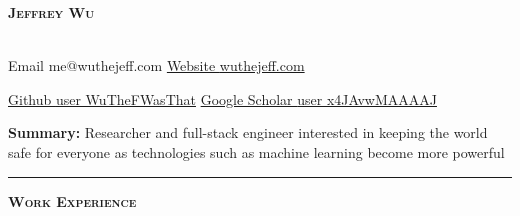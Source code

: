 \documentclass[11 pt]{article}
\begin{document}
\begin{center}
\begin{LARGE}\textsc{\textbf{Jeffrey Wu}}\end{LARGE} \\
Email {\tiny me@wuthejeff.com} \hfill
\href{http://wuthejeff.com}{Website {\tiny wuthejeff.com}}


\href{https://github.com/WuTheFWasThat}{Github {\tiny user WuTheFWasThat}}  \hfill \href{https://scholar.google.com/citations?user=x4JAvwMAAAAJ}{Google Scholar {\tiny user x4JAvwMAAAAJ}}\\
\end{center}

\noindent \textbf{Summary:}
Researcher and full-stack engineer
interested in keeping the world safe for everyone as technologies such as machine learning become more powerful \\





\hrule


\begin{center}\begin{Large}\textsc{\textbf{Work Experience}\\}\end{Large}\end{center}
\end{document}
